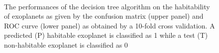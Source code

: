 \documentclass[
12pt, %
a4paper, %
oneside, %
headinclude,footinclude, %
BCOR5mm, %
]{scrartcl}
\begin{document}
\begin{figure}[htp]
  \centering
{}\\
\caption{The performances of the decision tree algorithm on the habitability of exoplanets as given by the confusion matrix (upper panel) and ROC curve (lower panel) as obtained by a 10-fold cross validation. A predicted (P) habitable exoplanet is classified as 1 while a test (T) non-habitable exoplanet is classified as 0}
\label{Decision_tree_performances}
\end{figure}
\end{document}
